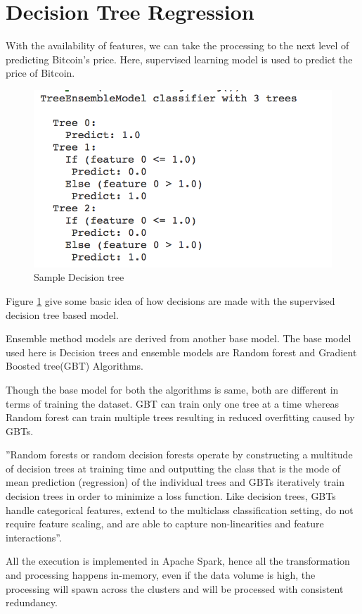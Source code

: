 \documentclass[sigconf]{acmart}
\begin{document}
\section{Decision Tree Regression}
With the availability of features, we can take the processing to the next level of predicting Bitcoin's price. Here, supervised learning model is used to predict the price of Bitcoin.

\begin{figure}[!ht]
  \centering\includegraphics[width=0.75\columnwidth]{images/Decisiontree.png}
  \caption{Sample Decision tree}
  \label{fig:8decisiongree}
\end{figure}
 

Figure \ref{fig:8decisiongree} give some basic idea of how decisions are made with the supervised decision tree based model.

Ensemble method models are derived from another base model. The base model used here is Decision trees and ensemble models are Random forest and Gradient Boosted tree(GBT) Algorithms.

Though the base model for both the algorithms is same, both are different in terms of training the dataset. GBT can train only one tree at a time whereas Random forest can train multiple trees resulting in reduced overfitting caused by GBTs.

''Random forests or random decision forests operate by constructing a multitude of decision trees at training time and outputting the class that is the mode of mean prediction (regression) of the individual trees and GBTs iteratively train decision trees in order to minimize a loss function. Like decision trees, GBTs handle categorical features, extend to the multiclass classification setting, do not require feature scaling, and are able to capture non-linearities and feature interactions''\cite{Ensemble4:online}.

All the execution is implemented in Apache Spark, hence all the transformation and processing happens in-memory, even if the data volume is high, the processing will spawn across the clusters and will be processed with consistent redundancy.
\end{document}
